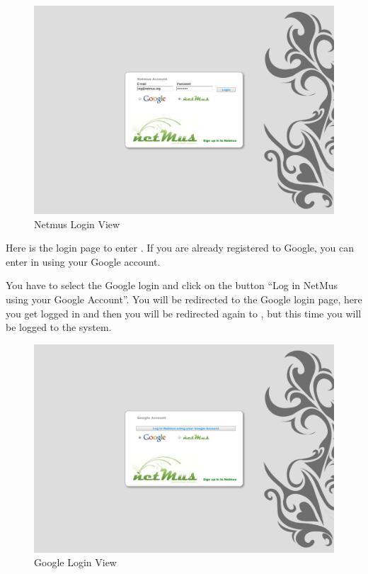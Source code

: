 \begin{figure}[htbp]
  \centering
  \includegraphics[width=15cm]{img/MU/login.png}
\caption{Netmus Login View}
\end{figure}


Here is the login page to enter . If you are already registered to
Google, you can enter in  using your Google account.

You have to select the Google login and click on the button ``Log in
NetMus using your Google Account''. You will be redirected to the Google login
page, here you get logged in and then you will be redirected again to
, but this time you will be logged to the system.\\

\begin{figure}[htbp]
  \centering
  \includegraphics[width=15cm]{img/MU/loginGoogle.png}
\caption{Google Login View}
\end{figure}


